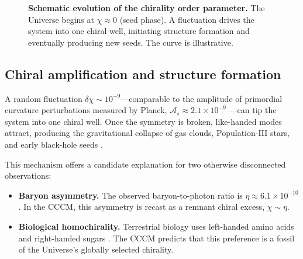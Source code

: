 \documentclass[a4paper,11pt]{article}
\newcommand{\CCCM}{CCCM}
\begin{document}
\begin{figure}[htbp]
\centering
{}
\caption{\textbf{Schematic evolution of the chirality order parameter.} The Universe begins at $\chi \approx 0$ (seed phase). A fluctuation drives the system into one chiral well, initiating structure formation and eventually producing new seeds. The curve is illustrative.}
\label{fig:phase}
\end{figure}

\subsection{Chiral amplification and structure formation}

A random fluctuation $\delta \chi \sim 10^{-9}$---comparable to the amplitude of primordial curvature perturbations measured by Planck, $\mathcal{A}_s \approx 2.1\times 10^{-9}$ \citep{Planck2020}---can tip the system into one chiral well. Once the symmetry is broken, like-handed modes attract, producing the gravitational collapse of gas clouds, Population-III stars, and early black-hole seeds \citep{Bromm2009,Volonteri2010}.

This mechanism offers a candidate explanation for two otherwise disconnected observations:
\begin{itemize}
    \item \textbf{Baryon asymmetry.} The observed baryon-to-photon ratio is $\eta \approx 6.1\times 10^{-10}$ \citep{Planck2020}. In the \CCCM, this asymmetry is recast as a remnant chiral excess, $\chi \sim \eta$.
    \item \textbf{Biological homochirality.} Terrestrial biology uses left-handed amino acids and right-handed sugars \citep{Blackmond2010}. The \CCCM{} predicts that this preference is a fossil of the Universe's globally selected chirality.
\end{itemize}
\end{document}
